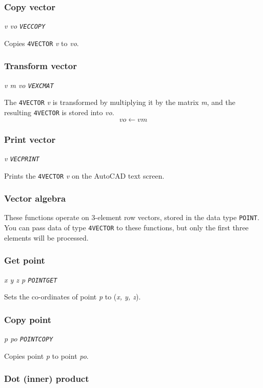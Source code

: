 \documentclass{article}
\begin{document}
\subsubsection{Copy vector}

{\em v vo {\tt VECCOPY}}

Copies {\tt 4VECTOR} {\em v} to {\em vo}.

\subsubsection{Transform vector}

{\em v m vo {\tt VEXCMAT}}

The {\tt 4VECTOR} {\em v} is transformed by multiplying it by the
matrix {\em m}, and the resulting {\tt 4VECTOR} is stored into {\em
vo}.  \[ \mathit{vo} \leftarrow \mathit{v} \mathit{m} \]

\subsubsection{Print vector}

{\em v {\tt VECPRINT}}

Prints the {\tt 4VECTOR} {\em v} on the AutoCAD text screen.

\subsubsection{Vector algebra}

These functions operate on 3-element row vectors, stored in the data
type {\tt POINT}\@.  You can pass data of type {\tt 4VECTOR} to these
functions, but only the first three elements will be processed.

\subsubsection{Get point}

{\em x y z p {\tt POINTGET}}

Sets the co-ordinates of point {\em p} to ({\em x, y, z}).

\subsubsection{Copy point}

{\em p po {\tt POINTCOPY}}

Copies point {\em p} to point {\em po}.

\subsubsection{Dot (inner) product}
\end{document}
